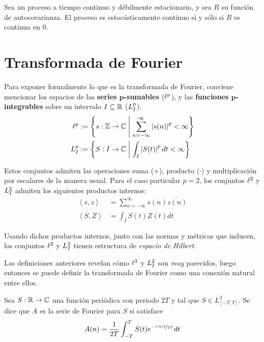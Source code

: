 \begin{proposicion}
Sea \xt un proceso a tiempo continuo y débilmente estacionario, y sea $R$ su función de autocovarianza. El proceso es estocásticamente continuo si y sólo si $R$ es continua en 0.
\end{proposicion}


\section{Transformada de Fourier}
\label{sec:fourier1}

Para exponer formalmente lo que es la transformada de Fourier, conviene mencionar los espacios de 
las \textbf{series $\boldsymbol{p}$-sumables} ($\ell^{p}$), y las  \textbf{funciones 
$\boldsymbol{p}$-integrables} sobre un intervalo $I \subseteq \mathbb{R}$ ($L^{p}_I$).
\begin{align*}
\ell^{p} &:= \left\{ s: \mathbb{Z}\rightarrow\mathbb{C} \mathrel{}\middle|\mathrel{} \sum_{n=-\infty}^{\infty} \left| s(n) \right|^{p} < \infty \right\}
\\
L^{p}_I &:= \left\{ S: I\rightarrow\mathbb{C} \mathrel{}\middle|\mathrel{} \int_I \left| S(t) \right|^{p} dt < \infty \right\}
\end{align*}

Estos conjuntos admiten las operaciones  suma ($+$), producto ($\cdot$) y multiplicación por 
escalares de la manera usual.
%
Para el caso particular $p=2$, los conjuntos $\ell^{2}$ y $L^{2}_I$ admiten los siguientes productos 
internos:
%
\begin{align*}
\left\langle s,z \right\rangle &= \sum_{n=-\infty}^{\infty} s(n) \overline{z(n)}\\
\left\langle S,Z \right\rangle &= \int_I S(t) \overline{Z(t)} dt
\end{align*}

Usando dichos productos internos, junto con las normas y métricas que inducen, los conjuntos 
$\ell^{2}$ y $L^{2}_I$ tienen estructura de \textit{espacio de Hilbert}.

Las definiciones anteriores revelan cómo $\ell^{2}$ y $L^{2}_I$ son \textit{muy} parecidos, luego
entonces se puede definir la transformada de Fourier como una conexión natural entre ellos.

\begin{definicion}
Sea $S: \mathbb{R} \rightarrow \mathbb{C}$ una función periódica con periodo $2T$ y tal que 
$S \in L^{2}_{[-T,T]}$. Se dice que $A$ es la serie de Fourier para $S$ si satisface
\begin{equation*}
A(n) = \frac{1}{2 T} \int_{- T }^{ T } S(t) e^{-\nicefrac{ i \left| n \right| t}{2T}} dt
\end{equation*}
\label{FourierClasico}
\end{definicion}

